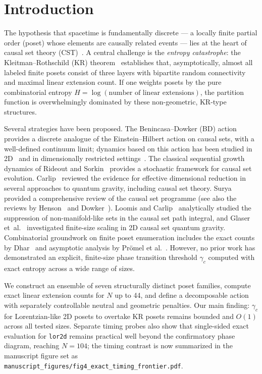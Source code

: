 \documentclass[11pt,a4paper]{article}
\begin{document}
\section{Introduction}
\label{sec:intro}

The hypothesis that spacetime is fundamentally discrete --- a locally finite partial order (poset) whose elements are causally related events --- lies at the heart of causal set theory (CST)~\cite{bombelli1987,sorkin2005}. A central challenge is the \emph{entropy catastrophe}: the Kleitman--Rothschild (KR) theorem~\cite{kleitman1975} establishes that, asymptotically, almost all labeled finite posets consist of three layers with bipartite random connectivity and maximal linear extension count. If one weights posets by the pure combinatorial entropy $H = \log(\text{number of linear extensions})$, the partition function is overwhelmingly dominated by these non-geometric, KR-type structures.

Several strategies have been proposed. The Benincasa--Dowker (BD) action~\cite{benincasa2010,benincasa2011} provides a discrete analogue of the Einstein--Hilbert action on causal sets, with a well-defined continuum limit; dynamics based on this action has been studied in 2D~\cite{surya2012,loomis2018} and in dimensionally restricted settings~\cite{cunningham2020}. The classical sequential growth dynamics of Rideout and Sorkin~\cite{rideout2000} provides a stochastic framework for causal set evolution. Carlip~\cite{carlip2017} reviewed the evidence for effective dimensional reduction in several approaches to quantum gravity, including causal set theory. Surya~\cite{surya2019} provided a comprehensive review of the causal set programme (see also the reviews by Henson~\cite{henson2006} and Dowker~\cite{dowker2005}). Loomis and Carlip~\cite{loomis2018} analytically studied the suppression of non-manifold-like sets in the causal set path integral, and Glaser et~al.~\cite{glaser2018} investigated finite-size scaling in 2D causal set quantum gravity. Combinatorial groundwork on finite poset enumeration includes the exact counts by Dhar~\cite{dhar1978} and asymptotic analysis by Pr\"omel et al.~\cite{promel2001}. However, no prior work has demonstrated an explicit, finite-size phase transition threshold $\gamma_c$ computed with exact entropy across a wide range of sizes.

We construct an ensemble of seven structurally distinct poset families, compute exact linear extension counts for $N$ up to 44, and define a decomposable action with separately controllable neutral and geometric penalties. Our main finding: $\gamma_c$ for Lorentzian-like 2D posets to overtake KR posets remains bounded and $O(1)$ across all tested sizes. Separate timing probes also show that single-sided exact evaluation for \texttt{lor2d} remains practical well beyond the confirmatory phase diagram, reaching $N = 104$; the timing contrast is now summarized in the manuscript figure set as \texttt{manuscript\_figures/fig4\_exact\_timing\_frontier.pdf}.
\end{document}
